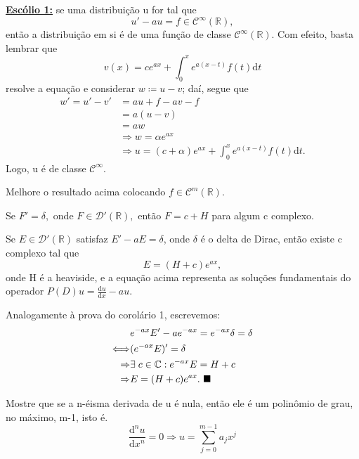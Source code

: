 \documentclass[../distribution_theory_notes.tex]{subfiles}
\begin{document}
\textbf{\underline{Escólio 1:}} se uma distribuição u for tal que
\[
	u'-au= f\in \mathcal{C}^{\infty}(\mathbb{R}),
\]
então a distribuição em si é de uma função de classe \(\mathcal{C}^{\infty}(\mathbb{R})\). Com efeito, basta lembrar que
\[
	v(x)=ce^{ax} + \int_{0}^{x}e^{a(x-t)}f(t) \mathrm{d}t
\]
resolve a equação e considerar \(w\coloneqq u-v\); daí, segue que
\begin{align*}
	w'= u'-v' & = au + f - av - f                                                           \\
	          & = a(u-v)                                                                    \\
	          & = aw                                                                        \\
	          & \Rightarrow w=\alpha e^{ax}                                                 \\
	          & \Rightarrow u = (c+\alpha )e^{ax} + \int_{0}^{x}e^{a(x-t)}f(t) \mathrm{d}t.
\end{align*}
Logo, u é de classe \(\mathcal{C}^{\infty}.\)
\begin{exr}
	Melhore o resultado acima colocando \(f\in \mathcal{C}^{m}(\mathbb{R}).\)
\end{exr}

\begin{tcolorbox}[
		skin=enhanced,
		title=Observação,
		fonttitle=\bfseries,
		colframe=black,
		colbacktitle=cyan!75!white,
		colback=cyan!15,
		colbacklower=black,
		coltitle=black,
		drop fuzzy shadow,
	]
	Se \(F'= \delta ,\) onde \(F\in \mathcal{D}'(\mathbb{R}),\) então \(F=c+H\) para algum c complexo.
\end{tcolorbox}

\begin{crl*}[Escólio 2]
	Se \(E\in \mathcal{D}'(\mathbb{R})\) satisfaz \(E' - a E = \delta \), onde \(\delta \) é o delta de Dirac, então existe c complexo tal que
	\[
		E = (H+c)e^{ax},
	\]
	onde H é a heaviside, e a equação acima representa as soluções fundamentais do operador \(P(D)u = \frac{\mathrm{d}u}{\mathrm{d}x}-au.\)
\end{crl*}
\begin{proof*}
	Analogamente à prova do corolário 1, escrevemos:
	\begin{align*}
		                    & e^{-ax}E'-ae^{-ax}=e^{-ax}\delta =\delta  \\
		\Longleftrightarrow & (e^{-ax}E)' = \delta                      \\
		\Rightarrow         & \exists\; c\in \mathbb{C}: e^{-ax}E = H+c \\
		\Rightarrow         & E = (H+c)e^{ax}. \text{ $\blacksquare$}
	\end{align*}
\end{proof*}
\begin{exr}
	Mostre que se a n-éisma derivada de u é nula, então ele é um polinômio de grau, no máximo, m-1, isto é.
	\[
		\frac{\mathrm{d}^{n}u}{\mathrm{d}x^{n}}=0 \Rightarrow u = \sum\limits_{j=0}^{m-1}a_{j}x^{j}
	\]
\end{exr}
\end{document}
